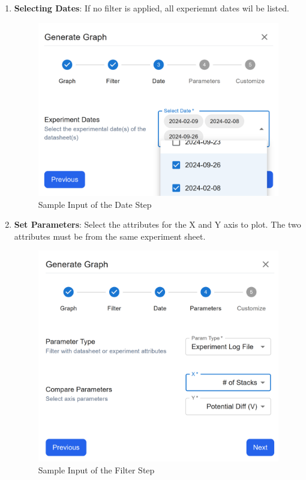 \documentclass[12pt]{article}
\begin{document}
\begin{enumerate}
    \item \textbf{Selecting Dates}: \newline
    If no filter is applied, all experiemnt dates wil be listed. 
    \begin{figure}[H]
        \centering
        \includegraphics[scale=0.4]{./Diagrams/graph-dates.png}
        \caption{Sample Input of the Date Step}
        \label{fig:example}
    \end{figure}
    
    \item \textbf{Set Parameters}: \newline
    Select the attributes for the X and Y axis to plot. The two attributes must
    be from the same experiment sheet. 
    \begin{figure}[H]
        \centering
        \includegraphics[scale=0.4]{./Diagrams/graph-param.png}
        \caption{Sample Input of the Filter Step}
        \label{fig:example}
    \end{figure}
    

\end{enumerate}
\end{document}
